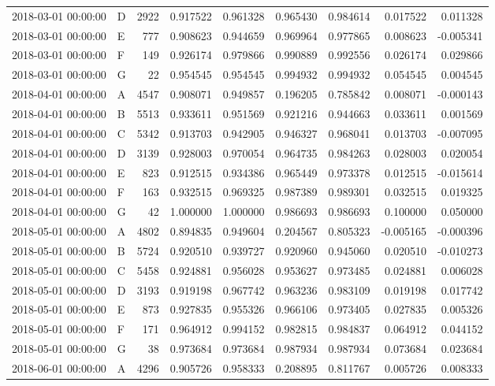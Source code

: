 \begin{tabular}{llrrrrrrr}
2018-03-01 00:00:00 & D & 2922 & 0.917522 & 0.961328 & 0.965430 & 0.984614 & 0.017522 & 0.011328 \\
2018-03-01 00:00:00 & E & 777 & 0.908623 & 0.944659 & 0.969964 & 0.977865 & 0.008623 & -0.005341 \\
2018-03-01 00:00:00 & F & 149 & 0.926174 & 0.979866 & 0.990889 & 0.992556 & 0.026174 & 0.029866 \\
2018-03-01 00:00:00 & G & 22 & 0.954545 & 0.954545 & 0.994932 & 0.994932 & 0.054545 & 0.004545 \\
2018-04-01 00:00:00 & A & 4547 & 0.908071 & 0.949857 & 0.196205 & 0.785842 & 0.008071 & -0.000143 \\
2018-04-01 00:00:00 & B & 5513 & 0.933611 & 0.951569 & 0.921216 & 0.944663 & 0.033611 & 0.001569 \\
2018-04-01 00:00:00 & C & 5342 & 0.913703 & 0.942905 & 0.946327 & 0.968041 & 0.013703 & -0.007095 \\
2018-04-01 00:00:00 & D & 3139 & 0.928003 & 0.970054 & 0.964735 & 0.984263 & 0.028003 & 0.020054 \\
2018-04-01 00:00:00 & E & 823 & 0.912515 & 0.934386 & 0.965449 & 0.973378 & 0.012515 & -0.015614 \\
2018-04-01 00:00:00 & F & 163 & 0.932515 & 0.969325 & 0.987389 & 0.989301 & 0.032515 & 0.019325 \\
2018-04-01 00:00:00 & G & 42 & 1.000000 & 1.000000 & 0.986693 & 0.986693 & 0.100000 & 0.050000 \\
2018-05-01 00:00:00 & A & 4802 & 0.894835 & 0.949604 & 0.204567 & 0.805323 & -0.005165 & -0.000396 \\
2018-05-01 00:00:00 & B & 5724 & 0.920510 & 0.939727 & 0.920960 & 0.945060 & 0.020510 & -0.010273 \\
2018-05-01 00:00:00 & C & 5458 & 0.924881 & 0.956028 & 0.953627 & 0.973485 & 0.024881 & 0.006028 \\
2018-05-01 00:00:00 & D & 3193 & 0.919198 & 0.967742 & 0.963236 & 0.983109 & 0.019198 & 0.017742 \\
2018-05-01 00:00:00 & E & 873 & 0.927835 & 0.955326 & 0.966106 & 0.973405 & 0.027835 & 0.005326 \\
2018-05-01 00:00:00 & F & 171 & 0.964912 & 0.994152 & 0.982815 & 0.984837 & 0.064912 & 0.044152 \\
2018-05-01 00:00:00 & G & 38 & 0.973684 & 0.973684 & 0.987934 & 0.987934 & 0.073684 & 0.023684 \\
2018-06-01 00:00:00 & A & 4296 & 0.905726 & 0.958333 & 0.208895 & 0.811767 & 0.005726 & 0.008333 \\

\end{tabular}
